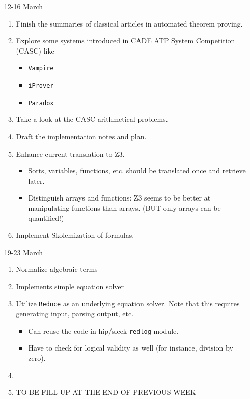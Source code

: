 \documentclass{article}
\begin{document}
\begin{enumerate}

\item [12-16 March]

\begin{enumerate}
\item Finish the summaries of classical articles in automated theorem proving.
\item Explore some systems introduced in CADE ATP System Competition (CASC) like
\begin{itemize}
\item \texttt{Vampire}
\item \texttt{iProver}
\item \texttt{Paradox}
\end{itemize} 
\item Take a look at the CASC arithmetical problems.\hfill \checkmark
\item Draft the implementation notes and plan.
\item Enhance current translation to Z3.
\begin{itemize}
\item Sorts, variables, functions, etc. should be translated once and retrieve later.
\item Distinguish arrays and functions: Z3 seems to be better at manipulating functions than arrays. (BUT only arrays can be quantified!)
\end{itemize}
\item Implement Skolemization of formulas.
\end{enumerate}

\item [19-23 March]

\begin{enumerate}
\item Normalize algebraic  terms
\item Implements simple equation solver
\item Utilize \texttt{Reduce} as an underlying equation solver. Note that this requires generating input, parsing output, etc.
\begin{itemize}
\item Can reuse the code in hip/sleek \texttt{redlog} module.
\item Have to check for logical validity as well (for instance, division by zero).
\end{itemize}
\item 
\item TO BE FILL UP AT THE END OF PREVIOUS WEEK
\end{enumerate}


\end{enumerate}
\end{document}
